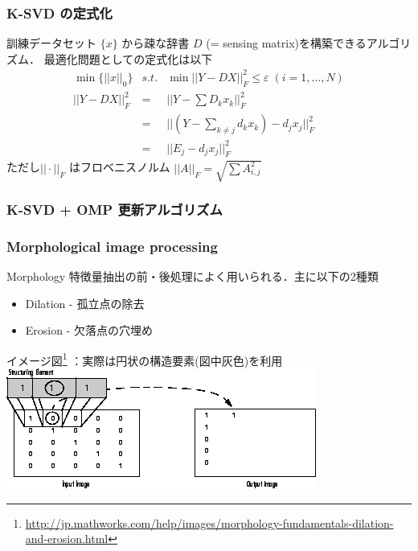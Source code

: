 \begin{frame}\frametitle{K-SVD の定式化}
訓練データセット $\{ x \}$ から疎な辞書 $D$ (= sensing matrix)を構築できるアルゴリズム．
最適化問題としての定式化は以下
\begin{eqnarray}
    \min \{||x||_0\} &s.t.& \min ||Y-DX||^2_F \leq \varepsilon \; (i = 1, \dots, N) \\
    ||Y-DX||^2_F &=& ||Y - \sum D_k x_k||^2_F \\
    &=& ||(Y - \sum_{k \neq j} d_k x_k) - d_j x_j||^2_F \\
    &=& ||E_j - d_j x_j||^2_F
\end{eqnarray}
ただし$||\cdot||_F$ はフロベニスノルム $||A||_F = \sqrt{\sum{A^2_{i,j}}}$
\end{frame}


\begin{frame}\frametitle{K-SVD + OMP 更新アルゴリズム}
\end{frame}


\begin{frame}\frametitle{Morphological image processing}
\begin{block}{Morphology}
特徴量抽出の前・後処理によく用いられる．主に以下の2種類
\begin{itemize}
    \item Dilation - 孤立点の除去
    \item Erosion - 欠落点の穴埋め
\end{itemize}
\end{block}

イメージ図\footnote
{\url{http://jp.mathworks.com/help/images/morphology-fundamentals-dilation-and-erosion.html}}
：実際は円状の構造要素(図中灰色)を利用
\includegraphics[scale=0.4]{figure/morph.png}
\end{frame}
